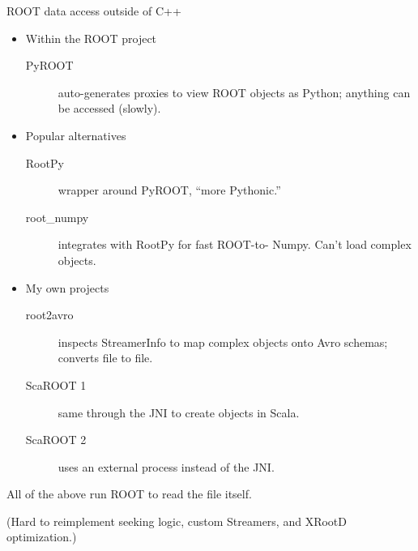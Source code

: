 \documentclass{beamer}
\begin{document}
\begin{frame}{ROOT data access outside of C++}
\begin{itemize}
\item Within the ROOT project

\begin{description}
\item[PyROOT] auto-generates proxies to view ROOT objects as Python; anything can be accessed (slowly).
\end{description}

\item Popular alternatives
\begin{description}
\item[RootPy] wrapper around PyROOT, ``more Pythonic.''
\item[root\_numpy] integrates with RootPy for fast ROOT-to- Numpy. Can't load complex objects.
\end{description}

\item My own projects
\begin{description}
\item[root2avro] inspects StreamerInfo to map complex objects onto Avro schemas; converts file to file.
\item[ScaROOT 1] same through the JNI to create objects in Scala.
\item[ScaROOT 2] uses an external process instead of the JNI.
\end{description}
\end{itemize}

All of the above run ROOT to read the file itself.

{\scriptsize (Hard to reimplement seeking logic, custom Streamers, and XRootD optimization.)}
\end{frame}
\end{document}
